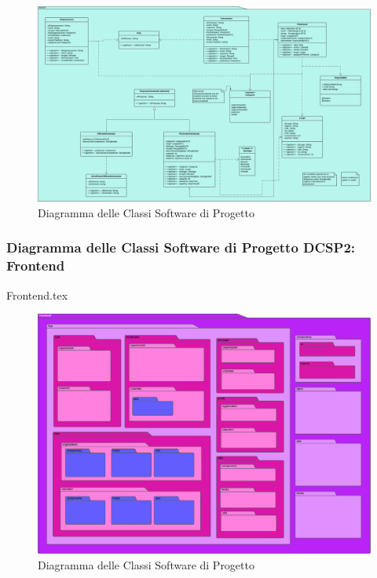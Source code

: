 \documentclass[12pt]{article}
\begin{document}
\begin{figure}[H]
    \includegraphics[width=\textwidth, height=\textheight,keepaspectratio]{Immagini/DCSP/Iterazione 1/DCSPDomain.png}
        \caption{Diagramma delle Classi Software di Progetto}
        \label{fig:diagrammaDCSP1}
\end{figure}

\subsubsection{Diagramma delle Classi Software di Progetto DCSP2: Frontend}
{Frontend.tex}

\begin{figure}[H]
    \includegraphics[width=\textwidth, height=\textheight,keepaspectratio]{Immagini/DCSP/Iterazione 1/DCSPFrontend.png}
        \caption{Diagramma delle Classi Software di Progetto}
        \label{fig:diagrammaDCSP2}
\end{figure}
\end{document}
